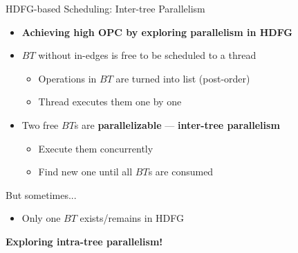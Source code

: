 \documentclass[handout]{beamer}
\begin{document}
\begin{CJK}{UTF8}{bkai}
            \begin{frame}{HDFG-based Scheduling: Inter-tree Parallelism}
                \begin{itemize}
                        \pause
                    \item \textbf{Achieving high OPC by exploring parallelism in HDFG}
                        \pause
                    \item {$BT$ without in-edges is free to be scheduled to a thread
                            \begin{itemize}
                                \item Operations in $BT$ are turned into list (post-order)
                                \item Thread executes them one by one
                            \end{itemize}
                        }
                        \pause
                    \item {Two free $BT$s are \textbf{parallelizable} --- \textbf{inter-tree parallelism}
                            \begin{itemize}
                                \item Execute them concurrently
                                \item Find new one until all $BT$s are consumed
                            \end{itemize}
                        }
                \end{itemize}
                \pause
                But sometimes...
                \begin{itemize}
                    \pause
                    \item {Only one $BT$ exists/remains in HDFG}
                \end{itemize}
                \pause
                \begin{center}
                \large{{\textbf{Exploring intra-tree parallelism!}}}
                \end{center}
            \end{frame}


\end{CJK}
\end{document}
